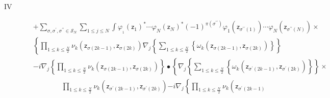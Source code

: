 \documentclass[aps,preprint]{revtex4}%
\begin{document}
\begin{description}
\item[IV]
\begin{align}
&  +%
{\textstyle\sum\limits_{\sigma,\sigma^{\prime},\sigma^{\prime\prime}%
\in\mathcal{S}_{N}}}
{\displaystyle\sum\limits_{1\leq j\leq N}}
\int\varphi_{_{1}}\left(  \mathsf{z}_{1}\right)  ^{\ast}\cdots\varphi
_{N}\left(  \mathsf{z}_{N}\right)  ^{\ast}\left(  -1\right)  ^{\pi\left(
\sigma^{\prime\prime}\right)  }\varphi_{1}\left(  \mathsf{z}_{\sigma
^{\prime\prime}\left(  1\right)  }\right)  \cdots\varphi_{N}\left(
\mathsf{z}_{\sigma^{\prime\prime}\left(  N\right)  }\right)  \times\nonumber\\
&  \left\{
{\displaystyle\prod\limits_{1\leq k\leq\frac{N}{2}}}
\nu_{k}\left(  \mathsf{z}_{\sigma\left(  2k-1\right)  },\mathsf{z}%
_{\sigma\left(  2k\right)  }\right)  \nabla_{j}\left\{
{\displaystyle\sum\limits_{1\leq k\leq\frac{N}{2}}}
\left\{  \omega_{k}\left(  \mathsf{z}_{\sigma\left(  2k-1\right)  }%
,\mathsf{z}_{\sigma\left(  2k\right)  }\right)  \right\}  \right\}  \right.
\nonumber\\
&  -i\nabla_{j}\left\{
{\displaystyle\prod\limits_{1\leq k\leq\frac{N}{2}}}
\nu_{k}\left(  \mathsf{z}_{\sigma\left(  2k-1\right)  },\mathsf{z}%
_{\sigma\left(  2k\right)  }\right)  \right\}  \bullet\left\{  \nabla
_{j}\left\{
{\displaystyle\sum\limits_{1\leq k\leq\frac{N}{2}}}
\left\{  \omega_{k}\left(  \mathsf{z}_{\sigma^{\prime}\left(  2k-1\right)
},\mathsf{z}_{\sigma^{\prime}\left(  2k\right)  }\right)  \right\}  \right\}
\right.  \times\nonumber\\
&  \qquad\qquad%
{\displaystyle\prod\limits_{1\leq k\leq\frac{N}{2}}}
\nu_{k}\left(  \mathsf{z}_{\sigma^{\prime}\left(  2k-1\right)  }%
,\mathsf{z}_{\sigma^{\prime}\left(  2k\right)  }\right)  \left.  -i\nabla
_{j}\left\{
{\displaystyle\prod\limits_{1\leq k\leq\frac{N}{2}}}
\nu_{k}\left(  \mathsf{z}_{\sigma^{\prime}\left(  2k-1\right)  }%

\end{align}
\end{description}
\end{document}
